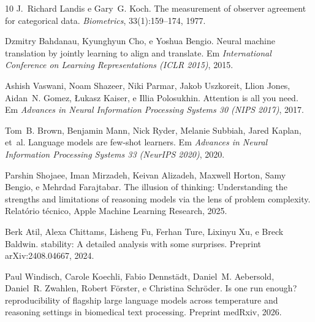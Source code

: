 \documentclass[12pt,a4paper]{article}
\begin{document}
\begin{thebibliography}{10}
J.~Richard Landis e Gary~G. Koch.
\newblock The measurement of observer agreement for categorical data.
\newblock \emph{Biometrics}, 33(1):159--174, 1977.

Dzmitry Bahdanau, Kyunghyun Cho, e Yoshua Bengio.
\newblock Neural machine translation by jointly learning to align and
  translate.
\newblock Em \emph{International Conference on Learning Representations (ICLR
  2015)}, 2015.

Ashish Vaswani, Noam Shazeer, Niki Parmar, Jakob Uszkoreit, Llion Jones,
  Aidan~N. Gomez, {\L}ukasz Kaiser, e Illia Polosukhin.
\newblock Attention is all you need.
\newblock Em \emph{Advances in Neural Information Processing Systems 30 (NIPS
  2017)}, 2017.

Tom~B. Brown, Benjamin Mann, Nick Ryder, Melanie Subbiah, Jared Kaplan, et~al.
\newblock Language models are few-shot learners.
\newblock Em \emph{Advances in Neural Information Processing Systems 33
  (NeurIPS 2020)}, 2020.

Parshin Shojaee, Iman Mirzadeh, Keivan Alizadeh, Maxwell Horton, Samy Bengio,
  e Mehrdad Farajtabar.
\newblock The illusion of thinking: Understanding the strengths and
  limitations of reasoning models via the lens of problem complexity.
\newblock Relatório técnico, Apple Machine Learning Research, 2025.

Berk Atil, Alexa Chittams, Lisheng Fu, Ferhan Ture, Lixinyu Xu, e Breck Baldwin.
 stability: A detailed analysis with some surprises.
\newblock Preprint arXiv:2408.04667, 2024.

Paul Windisch, Carole Koechli, Fabio Dennstädt, Daniel~M. Aebersold,
  Daniel~R. Zwahlen, Robert Förster, e Christina Schröder.
\newblock Is one run enough? reproducibility of flagship large language models
  across temperature and reasoning settings in biomedical text processing.
\newblock Preprint medRxiv, 2026.

\end{thebibliography}
\end{document}
